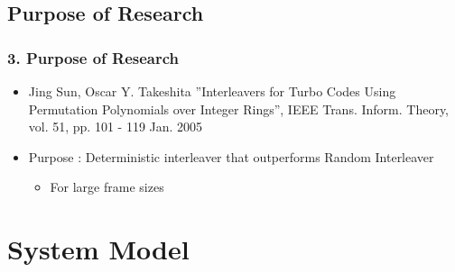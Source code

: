 \documentclass{beamer}  %
\begin{document}
\subsection{Purpose of Research}

\begin{frame}
\frametitle{3. Purpose of Research}
\begin{itemize}
\setlength\itemsep{2em}
\item Jing Sun, Oscar Y. Takeshita ”Interleavers for Turbo Codes Using Permutation Polynomials over Integer Rings”, IEEE Trans. Inform. Theory, vol. 51,
pp. 101 - 119 Jan. 2005

\item Purpose : Deterministic interleaver that outperforms Random Interleaver

\begin{itemize}
\item For large frame sizes
\end{itemize}
\end{itemize}
\end{frame}

\section{System Model}
\end{document}
